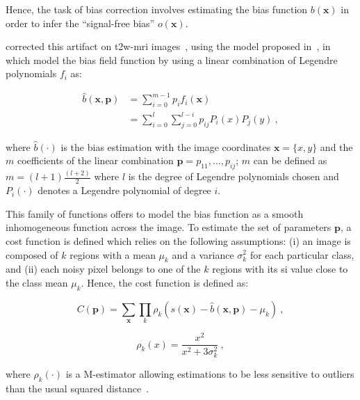 \begin{enumerate}[leftmargin=*]
Hence, the task of bias correction involves estimating the bias function
$b(\mathbf{x})$ in order to infer the ``signal-free bias'' $o(\mathbf{x})$.

\citeauthor{Viswanath2009} corrected this artifact on \ac{t2w}-\ac{mri}
images~\cite{Viswanath2009}, using the model proposed in~\cite{Styner2000}, in
which \citeauthor{Styner2000} model the bias field function by using a linear
combination of Legendre polynomials $f_i$ as:

\begin{align}
  \hat{b}(\mathbf{x},\mathbf{p}) & = \sum_{i=0}^{m-1} p_i f_i(\mathbf{x}) \\
  \nonumber
                                 & =  \sum_{i=0}^{l} \sum_{j=0}^{l-i} p_{ij}
                                   P_i(x) P_j(y) \ ,
                                   \label{eq:biascorr}
\end{align}

\noindent where $\hat{b}(\cdot)$ is the bias estimation with the image
coordinates $\mathbf{x} = \{x,y\}$ and the $m$ coefficients of the linear
combination $\mathbf{p} = {p_{11},\dotsc,p_{ij}}$; $m$ can be defined as
$m=(l+1)\frac{(l+2)}{2}$ where $l$ is the degree of Legendre polynomials chosen
and $P_i(\cdot)$ denotes a Legendre polynomial of degree $i$.

This family of functions offers to model the bias function as a smooth
inhomogeneous function across the image.
To estimate the set of parameters $\mathbf{p}$, a cost function is defined
which relies on the following assumptions: (i) an image is composed of $k$
regions with a mean $\mu_k$ and a variance $\sigma^{2}_{k}$ for each particular
class, and (ii) each noisy pixel belongs to one of the $k$ regions with its
\ac{si} value close to the class mean $\mu_k$.
Hence, the cost function is defined as:

\begin{equation}
  C(\mathbf{p}) = \sum_{\mathbf{x}} \prod_{k} \rho_k(s(\mathbf{x}) -
  \hat{b}(\mathbf{x},\mathbf{p}) - \mu_k) \ ,
  \label{eq:costbias}
\end{equation}

\begin{equation}
  \rho_k(x) = \frac{x^2}{x^2 + 3 \sigma_k^2} \ ,
  \label{eq:mestbias}
\end{equation}

\noindent where $\rho_k(\cdot)$ is a M-estimator allowing estimations to be
less sensitive to outliers than the usual squared distance~\cite{Li1996}.


\end{enumerate}
